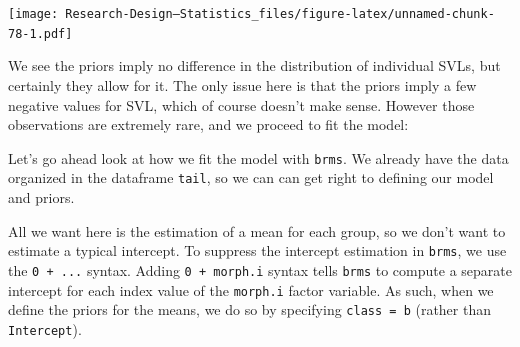 \documentclass[
]{book}
\newenvironment{Shaded}{\begin{snugshade}}{\end{snugshade}}
\newcommand{\AttributeTok}[1]{\textcolor[rgb]{0.13,0.29,0.53}{#1}}
\newcommand{\FloatTok}[1]{\textcolor[rgb]{0.00,0.00,0.81}{#1}}
\newcommand{\FunctionTok}[1]{\textcolor[rgb]{0.13,0.29,0.53}{\textbf{#1}}}
\newcommand{\NormalTok}[1]{#1}
\newcommand{\OtherTok}[1]{\textcolor[rgb]{0.56,0.35,0.01}{#1}}
\newcommand{\SpecialCharTok}[1]{\textcolor[rgb]{0.81,0.36,0.00}{\textbf{#1}}}
\newcommand{\StringTok}[1]{\textcolor[rgb]{0.31,0.60,0.02}{#1}}
\begin{document}
\begin{Shaded}
\end{Shaded}

\texttt{[image: Research-Design---Statistics\_files/figure-latex/unnamed-chunk-78-1.pdf]}

We see the priors imply no difference in the distribution of individual SVLs, but certainly they allow for it. The only issue here is that the priors imply a few negative values for SVL, which of course doesn't make sense. However those observations are extremely rare, and we proceed to fit the model:

Let's go ahead look at how we fit the model with \texttt{brms}. We already have the data organized in the dataframe \texttt{tail}, so we can can get right to defining our model and priors.

All we want here is the estimation of a mean for each group, so we don't want to estimate a typical intercept. To suppress the intercept estimation in \texttt{brms}, we use the \texttt{0\ +\ ...} syntax. Adding \texttt{0\ +\ morph.i} syntax tells \texttt{brms} to compute a separate intercept for each index value of the \texttt{morph.i} factor variable. As such, when we define the priors for the means, we do so by specifying \texttt{class\ =\ b} (rather than \texttt{Intercept}).
\end{document}
